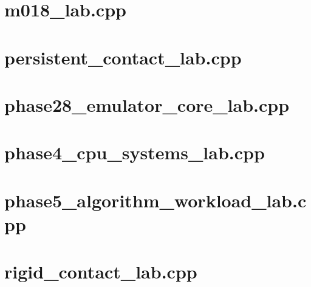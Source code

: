 \documentclass[11pt,twoside,openany]{book}
\begin{document}
\section*{m018\_lab.cpp}
\hypertarget{source-file-44c320ffad9698c7abd453e2}{}
\label{attachmentstart:source-file-44c320ffad9698c7abd453e2}
\section*{persistent\_contact\_lab.cpp}
\hypertarget{source-file-552a9e2296dc984412c8f06d}{}
\label{attachmentstart:source-file-552a9e2296dc984412c8f06d}
\section*{phase28\_emulator\_core\_lab.cpp}
\hypertarget{source-file-0060a91bd24dd25d6c14e679}{}
\label{attachmentstart:source-file-0060a91bd24dd25d6c14e679}
\section*{phase4\_cpu\_systems\_lab.cpp}
\hypertarget{source-file-0ec69e1a1a11439bca29faa5}{}
\label{attachmentstart:source-file-0ec69e1a1a11439bca29faa5}
\section*{phase5\_algorithm\_workload\_lab.cpp}
\hypertarget{source-file-103f7ae75398744dea475e34}{}
\label{attachmentstart:source-file-103f7ae75398744dea475e34}
\section*{rigid\_contact\_lab.cpp}
\hypertarget{source-file-32e93bc026677e074aaa7771}{}
\label{attachmentstart:source-file-32e93bc026677e074aaa7771}
\end{document}
